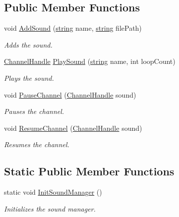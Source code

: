 \subsection*{Public Member Functions}
\begin{DoxyCompactItemize}
\item 
void \hyperlink{class_sound_manager_ad56a7065047a87b29ddc43c9d3519adf}{Add\+Sound} (\hyperlink{_types_8h_ad453f9f71ce1f9153fb748d6bb25e454}{string} name, \hyperlink{_types_8h_ad453f9f71ce1f9153fb748d6bb25e454}{string} file\+Path)
\begin{DoxyCompactList}\small\item\em Adds the sound. \end{DoxyCompactList}\item 
\hyperlink{_sound_manager_8h_a79c9822645ca72b4270fd14bdadbb699}{Channel\+Handle} \hyperlink{class_sound_manager_ac08b9c4aadde6c9f4a53d34cacce9085}{Play\+Sound} (\hyperlink{_types_8h_ad453f9f71ce1f9153fb748d6bb25e454}{string} name, int loop\+Count)
\begin{DoxyCompactList}\small\item\em Plays the sound. \end{DoxyCompactList}\item 
void \hyperlink{class_sound_manager_ae0739bfef9dac54b77da95977235252c}{Pause\+Channel} (\hyperlink{_sound_manager_8h_a79c9822645ca72b4270fd14bdadbb699}{Channel\+Handle} sound)
\begin{DoxyCompactList}\small\item\em Pauses the channel. \end{DoxyCompactList}\item 
void \hyperlink{class_sound_manager_a49049a8c11d28616f2a4cfdccbfeb739}{Resume\+Channel} (\hyperlink{_sound_manager_8h_a79c9822645ca72b4270fd14bdadbb699}{Channel\+Handle} sound)
\begin{DoxyCompactList}\small\item\em Resumes the channel. \end{DoxyCompactList}\end{DoxyCompactItemize}
\subsection*{Static Public Member Functions}
\begin{DoxyCompactItemize}
\item 
static void \hyperlink{class_sound_manager_a71a04bb67e3eb8b360ebcf0c6583c552}{Init\+Sound\+Manager} ()
\begin{DoxyCompactList}\small\item\em Initializes the sound manager. \end{DoxyCompactList}\end{DoxyCompactItemize}
